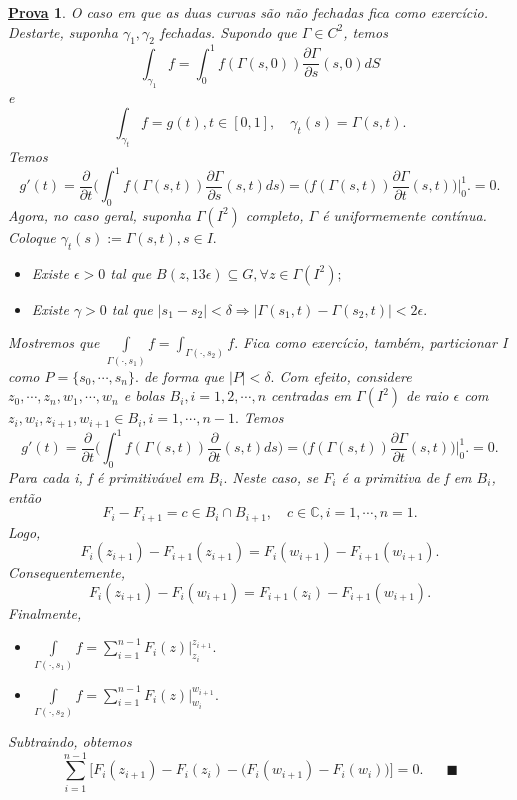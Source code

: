 \documentclass{article}
\newtheorem*{proof*}{\underline{Prova}}
\renewcommand\qedsymbol{$\blacksquare$}
\begin{document}
\begin{proof*}
  O caso em que as duas curvas s\~ao n\~ao fechadas fica como exerc\'icio. Destarte, suponha $\gamma_{1}, \gamma_{2}$ fechadas. 
Supondo que $\Gamma\in{C^{2}}$, temos
  $$
    \int_{\gamma_{1}}^{}f = \int_{0}^{1}f(\Gamma(s, 0))\frac{\partial{\Gamma}}{\partial{s}}(s, 0)dS
  $$
  e
  $$
    \int_{\gamma_{t}}^{}f = g(t), t\in[0, 1], \quad \gamma_{t}(s) = \Gamma(s, t).
  $$
  Temos
  $$
    g'(t) = \frac{\partial{}}{\partial{t}}\biggl(\int_{0}^{1}f(\Gamma(s, t))\frac{\partial{\Gamma}}{\partial{s}}(s, t)ds\biggr) = \biggl(f(\Gamma(s,t ))\frac{\partial{\Gamma}}{\partial{t}}(s, t)\biggr)\biggl|_0^1\biggr. = 0.
  $$
  Agora, no caso geral, suponha $\Gamma(I^2)$ completo, $\Gamma$ \'e uniformemente cont\'inua. Coloque $\gamma_{t}(s):= \Gamma(s, t), s\in{I}.$
 \begin{itemize}
 \item[1)] Existe $\epsilon > 0$ tal que $B(z, 13 \epsilon)\subseteq{G},\forall z\in{\Gamma(I^2)};$
 \item[2)] Existe $\gamma > 0$ tal que $|s_1 - s_2| < \delta\Rightarrow |\Gamma(s_1, t) - \Gamma(s_2, t)| < 2 \epsilon.$ 
 \end{itemize}
 Mostremos que $\int\limits_{\Gamma(\cdot, s_1)}^{}f = \int_{\Gamma(\cdot, s_2)}^{}f.$ Fica como exerc\'icio, tamb\'em, particionar
 I como $P=\{s_{0}, \cdots, s_{n}\}.$ de forma que $|P| < \delta.$ Com efeito, considere $z_{0}, \cdots, z_{n}, w_{1}, \cdots, w_{n}$ e bolas
 $B_{i}, i = 1, 2, \cdots, n$ centradas em $\Gamma(I^2)$ de raio $\epsilon$ com $z_{i}, w_{i}, z_{i+1}, w_{i+1}\in{B_{i}}, i = 1, \cdots, n-1.$
 Temos 
 $$
    g'(t) = \frac{\partial{}}{\partial{t}}\biggl(\int_{0}^{1}f(\Gamma(s, t))\frac{\partial{}}{\partial{t}}(s, t)ds\biggr) = \biggl(f(\Gamma(s, t))\frac{\partial{\Gamma}}{\partial{t}}(s, t)\biggr)\biggl|_0^1\biggr. = 0.
 $$
 Para cada i, f \'e primitiv\'avel em $B_{i}.$ Neste caso, se $F_{i}$ \'e a primitiva de f em $B_{i}$, ent\~ao
 $$
    F_{i} - F_{i+1} = c \in B_{i}\cap{B_{i+1}}, \quad c\in \mathbb{C}, i=1, \cdots, n=1.
 $$
 Logo,
 $$
    F_{i}(z_{i+1}) - F_{i+1}(z_{i+1}) = F_{i}(w_{i+1}) - F_{i+1}(w_{i+1}).
 $$
 Consequentemente, 
 $$
  F_{i}(z_{i+1}) - F_{i}(w_{i+1}) = F_{i+1}(z_{i}) - F_{i+1}(w_{i+1}).
 $$
 Finalmente, 
\begin{itemize}
  \item[I)] $\int\limits_{\Gamma(\cdot, s_{1})}^{}f = \sum\limits_{i=1}^{n-1}F_{i}(z)\biggl|_{z_{i}}^{z_{i+1}}\biggr.$
  \item[II)] $\int\limits_{\Gamma(\cdot, s_2)}^{}f = \sum\limits_{i=1}^{n-1}F_{i}(z)\biggl|_{w_{i}}^{w_{i+1}}\biggr.$
\end{itemize}
Subtraindo, obtemos
  $$
  \sum\limits_{i=1}^{n-1}\biggl[F_{i}(z_{i+1}) - F_{i}(z_{i}) - \biggl(F_{i}(w_{i+1}) - F_{i}(w_{i})\biggr)\biggr] = 0.\quad\text{ \qedsymbol}
  $$
\end{proof*}
\end{document}
